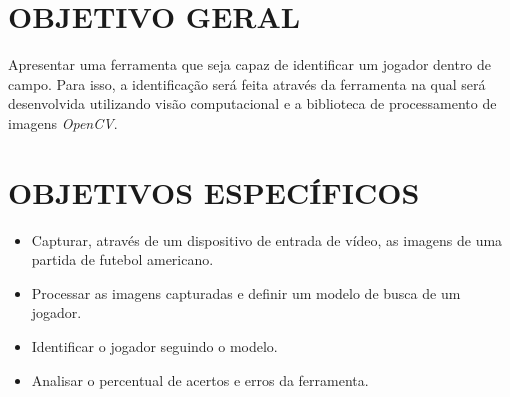 \section{{OBJETIVO GERAL}}
Apresentar uma ferramenta que seja capaz de identificar um jogador dentro de campo. Para isso, a identificação será feita através da ferramenta na qual será desenvolvida utilizando visão computacional e a biblioteca de processamento de imagens \textit{OpenCV}. 


\section{{OBJETIVOS ESPECÍFICOS}}
 \begin{itemize}
   \item Capturar, através de um dispositivo de entrada de vídeo, as imagens de uma partida de futebol americano.
   
   \item Processar as imagens capturadas e definir um modelo de busca de um jogador.
   
   \item Identificar o jogador seguindo o modelo.
   
   \item Analisar o percentual de acertos e erros da ferramenta.
   
 \end{itemize}